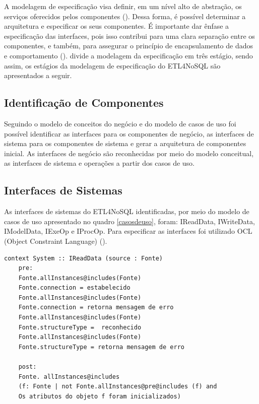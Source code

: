 A modelagem de especificação visa definir, em um nível alto de abstração, os serviços oferecidos pelos componentes (\cite{itana:2005}). Dessa forma, é possível determinar a arquitetura e especificar os seus componentes. É importante dar ênfase a especificação das interfaces, pois isso contribui para uma clara separação entre os componentes, e também, para assegurar o princípio de encapsulamento de dados e comportamento (\cite{itana:2005}). \cite{cheesman:2001} divide a modelagem da especificação em três estágio, sendo assim, os estágios da modelagem de especificação do ETL4NoSQL são apresentados a seguir.


\subsection{Identificação de Componentes}
Seguindo o modelo de conceitos do negócio e do modelo de casos de uso foi possível identificar as interfaces para os componentes de negócio, as interfaces de sistema para os componentes de sistema e gerar a arquitetura de componentes inicial. As interfaces de negócio são reconhecidas por meio do modelo conceitual,  as interfaces de sistema e operações a partir dos casos de uso.

\subsection{Interfaces de Sistemas}

As interfaces de sistemas do ETL4NoSQL identificadas, por meio do modelo de casos de uso apresentado no quadro \ref{casosdeuso}, foram: IReadData, IWriteData, IModelData, IExeOp e IProcOp. Para especificar as interfaces foi utilizado OCL (Object Constraint Language) (\cite{warmer:1998}).
\\
%
\begin{lstlisting}[frame=single, language=Oberon-2, basicstyle=\small]
	context System :: IReadData (source : Fonte)	
	pre:	
	Fonte.allInstances@includes(Fonte) 
	Fonte.connection = estabelecido	
	Fonte.allInstances@includes(Fonte) 
	Fonte.connection = retorna mensagem de erro
	Fonte.allInstances@includes(Fonte) 
	Fonte.structureType =  reconhecido	
	Fonte.allInstances@includes(Fonte)
	Fonte.structureType = retorna mensagem de erro	
	
	post:
	Fonte. allInstances@includes 
	(f: Fonte | not Fonte.allInstances@pre@includes (f) and	
	Os atributos do objeto f foram inicializados)	
\end{lstlisting}

